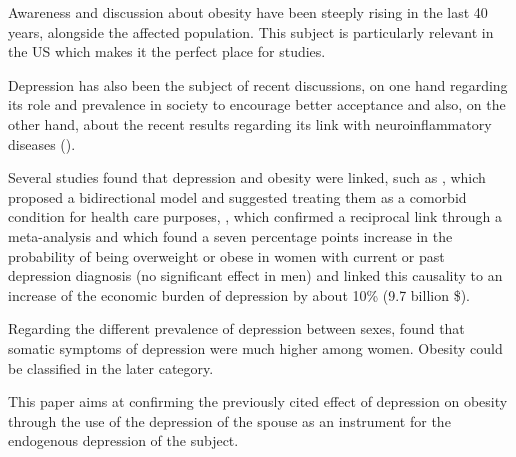 

Awareness and discussion about obesity have been steeply rising in the last 40 years,  alongside the affected population. This subject is particularly relevant in the US which makes it the perfect place for studies.

Depression has also been the subject of recent discussions, on one hand regarding its role and prevalence in society to encourage better acceptance and also, on the other hand, about the recent results regarding its link with neuroinflammatory diseases (\cite{neuro}).

Several studies found that depression and obesity were linked, such as \cite{markowitz}, which proposed a bidirectional model and suggested treating them as a comorbid condition for health care purposes, \cite{luppino}, which confirmed a reciprocal link through a meta-analysis and \cite{dave} which found a seven percentage points increase in the probability of being overweight or obese in women with current or past depression diagnosis (no significant effect in men) and linked this causality to an increase of the economic burden of depression by about 10\% (9.7 billion \$).

Regarding the different prevalence of depression between sexes, \cite{silver} found that somatic symptoms of depression were much higher among women. Obesity could be classified in the later category.

This paper aims at confirming the previously cited effect of depression on obesity through the use of the depression of the spouse as an instrument for the endogenous depression of the subject.
